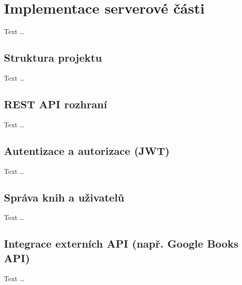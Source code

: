 
\section{Implementace serverové části}
Text \dots


\subsection{Struktura projektu}
Text \dots


\subsection{REST API rozhraní}
Text \dots


\subsection{Autentizace a autorizace (JWT)}
Text \dots


\subsection{Správa knih a uživatelů}
Text \dots

\subsection{Integrace externích API (např. Google Books API)}
Text \dots



